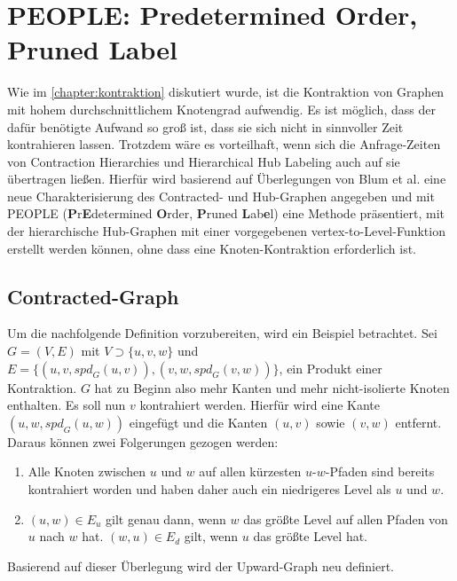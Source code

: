 \chapter{PEOPLE: Predetermined Order, Pruned Label}\label{chapter:people}

Wie im \autoref{chapter:kontraktion} diskutiert wurde, ist die Kontraktion von Graphen mit hohem durchschnittlichem Knotengrad aufwendig.
Es ist möglich, dass der dafür benötigte Aufwand so groß ist, dass sie sich nicht in sinnvoller Zeit kontrahieren lassen.
Trotzdem wäre es vorteilhaft, wenn sich die Anfrage-Zeiten von Contraction Hierarchies und Hierarchical Hub Labeling auch auf sie übertragen ließen.
Hierfür wird basierend auf Überlegungen von Blum et al. \cite{blum2021sublinear} eine neue Charakterisierung des Contracted- und Hub-Graphen angegeben und mit PEOPLE (\textbf{P}r\textbf{E}determined \textbf{O}rder, \textbf{P}runed \textbf{L}ab\textbf{e}l) eine Methode präsentiert, mit der hierarchische Hub-Graphen mit einer vorgegebenen vertex-to-Level-Funktion erstellt werden können, ohne dass eine Knoten-Kontraktion erforderlich ist.

\section{Contracted-Graph}

Um die nachfolgende Definition vorzubereiten, wird ein Beispiel betrachtet.
Sei $G = (V, E)$ mit $V \supset \{ u, v, w \}$ und $E = \{ (u, v, {spd}_G (u, v)), (v, w, {spd}_G (v, w)) \}$, ein Produkt einer Kontraktion.
$G$ hat zu Beginn also mehr Kanten und mehr nicht-isolierte Knoten enthalten.
Es soll nun $v$ kontrahiert werden.
Hierfür wird eine Kante $(u, w, {spd}_G (u, w))$ eingefügt und die Kanten $(u, v)$ sowie $(v, w)$ entfernt.
Daraus können zwei Folgerungen gezogen werden:

\begin{enumerate}
  \item
        Alle Knoten zwischen $u$ und $w$ auf allen kürzesten $u$-$w$-Pfaden sind bereits kontrahiert worden und haben daher auch ein niedrigeres Level als $u$ und $w$.

  \item
        $(u, w) \in E_u$ gilt genau dann, wenn $w$ das größte Level auf allen Pfaden von $u$ nach $w$ hat.
        $(w, u) \in E_d$ gilt, wenn $u$ das größte Level hat.
\end{enumerate}

Basierend auf dieser Überlegung wird der Upward-Graph neu definiert.

